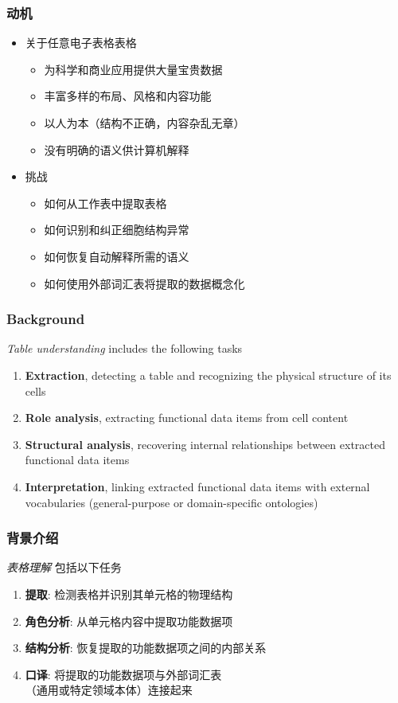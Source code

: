 \documentclass[10pt]{beamer}
\begin{document}
\begin{frame}
\frametitle{动机}
\begin{itemize}
\item 关于任意电子表格表格
\begin{itemize}
	\item 为科学和商业应用提供大量宝贵数据
	\item 丰富多样的布局、风格和内容功能
	\item 以人为本（结构不正确，内容杂乱无章）
	\item 没有明确的语义供计算机解释
\end{itemize}
\bigskip
\item 挑战
\begin{itemize}
	\item 如何从工作表中提取表格
	\item 如何识别和纠正细胞结构异常
	\item 如何恢复自动解释所需的语义
	\item 如何使用外部词汇表将提取的数据概念化
\end{itemize}
\end{itemize}
\end{frame}

\begin{frame}
\frametitle{Background}
\emph{Table understanding} includes the following tasks
\bigskip
\begin{enumerate}
	\item \textbf{Extraction}, detecting a table and recognizing the physical structure of its cells
	\item \textbf{Role analysis}, extracting functional data items from cell content
	\item \textbf{Structural analysis}, recovering internal relationships between extracted functional data items
	\item \textbf{Interpretation}, linking extracted functional data items with external vocabularies (general-purpose or domain-specific ontologies)
\end{enumerate}
\end{frame}

\begin{frame}
\frametitle{背景介绍}
\emph{表格理解} 包括以下任务
\bigskip
\begin{enumerate}
	\item \textbf{提取}: 检测表格并识别其单元格的物理结构
	\item \textbf{角色分析}:  从单元格内容中提取功能数据项
	\item \textbf{结构分析}: 恢复提取的功能数据项之间的内部关系
	\item \textbf{口译}: 将提取的功能数据项与外部词汇表\\（通用或特定领域本体）连接起来
\end{enumerate}
\end{frame}
\end{document}
